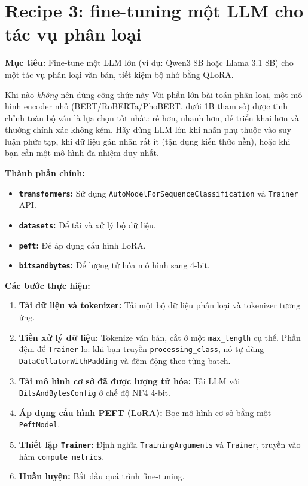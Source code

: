 
\section{Recipe 3: fine-tuning một LLM cho tác vụ phân loại}
\label{sec:recipe_classification_finetuning}

\textbf{Mục tiêu:} Fine-tune một LLM lớn (ví dụ: Qwen3 8B hoặc Llama 3.1 8B) cho một tác vụ phân loại văn bản, tiết kiệm bộ nhớ bằng QLoRA.

\begin{keyidea}{Khi nào \emph{không} nên dùng công thức này}
Với phần lớn bài toán phân loại, một mô hình encoder nhỏ (BERT/RoBERTa/PhoBERT, dưới 1B tham số) được tinh chỉnh toàn bộ vẫn là lựa chọn tốt nhất: rẻ hơn, nhanh hơn, dễ triển khai hơn và thường chính xác không kém. Hãy dùng LLM lớn khi nhãn phụ thuộc vào suy luận phức tạp, khi dữ liệu gán nhãn rất ít (tận dụng kiến thức nền), hoặc khi bạn cần một mô hình đa nhiệm duy nhất.
\end{keyidea}

\textbf{Thành phần chính:}
\begin{itemize}
    \item \textbf{\texttt{transformers}:} Sử dụng \texttt{Auto\allowbreak Model\allowbreak For\allowbreak Sequence\allowbreak Classification} và \texttt{Trainer} API.
    \item \textbf{\texttt{datasets}:} Để tải và xử lý bộ dữ liệu.
    \item \textbf{\texttt{peft}:} Để áp dụng cấu hình LoRA.
    \item \textbf{\texttt{bitsandbytes}:} Để lượng tử hóa mô hình sang 4-bit.
\end{itemize}

\textbf{Các bước thực hiện:}
\begin{enumerate}
    \item \textbf{Tải dữ liệu và tokenizer:} Tải một bộ dữ liệu phân loại và tokenizer tương ứng.
    \item \textbf{Tiền xử lý dữ liệu:} Tokenize văn bản, cắt ở một \texttt{max\_length} cụ thể. Phần đệm để \texttt{Trainer} lo: khi bạn truyền \texttt{processing\_class}, nó tự dùng \texttt{Data\allowbreak Collator\allowbreak With\allowbreak Padding} và đệm động theo từng batch.
    \item \textbf{Tải mô hình cơ sở đã được lượng tử hóa:} Tải LLM với \texttt{BitsAndBytesConfig} ở chế độ NF4 4-bit.
    \item \textbf{Áp dụng cấu hình PEFT (LoRA):} Bọc mô hình cơ sở bằng một \texttt{PeftModel}.
    \item \textbf{Thiết lập \texttt{Trainer}:} Định nghĩa \texttt{TrainingArguments} và \texttt{Trainer}, truyền vào hàm \texttt{compute\_metrics}.
    \item \textbf{Huấn luyện:} Bắt đầu quá trình fine-tuning.
\end{enumerate}

